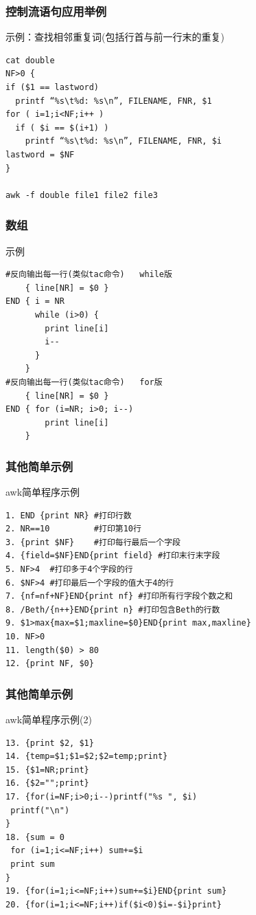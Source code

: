 \documentclass[xcolor=svgnames,presentation]{beamer}
\begin{document}
\begin{frame}[fragile]
\frametitle{控制流语句应用举例}
\label{sec-2-2-21}
\begin{exampleblock}{示例：查找相邻重复词(包括行首与前一行末的重复)}
\label{sec-2-2-21-1}


\begin{verbatim}
cat double
NF>0 {
if ($1 == lastword)
  printf “%s\t%d: %s\n”, FILENAME, FNR, $1
for ( i=1;i<NF;i++ )
  if ( $i == $(i+1) )
    printf “%s\t%d: %s\n”, FILENAME, FNR, $i
lastword = $NF
}

awk -f double file1 file2 file3
\end{verbatim}
\end{exampleblock}
\end{frame}
\begin{frame}[fragile]
\frametitle{数组}
\label{sec-2-2-22}
\begin{exampleblock}{示例}
\label{sec-2-2-22-1}


\begin{verbatim}
#反向输出每一行(类似tac命令)   while版
    { line[NR] = $0 }
END { i = NR
      while (i>0) {
        print line[i]
        i--
      } 
    }
#反向输出每一行(类似tac命令)   for版
    { line[NR] = $0 }
END { for (i=NR; i>0; i--)
        print line[i]
    }
\end{verbatim}
\end{exampleblock}
\end{frame}
\begin{frame}[fragile]
\frametitle{其他简单示例}
\label{sec-2-2-23}
\begin{exampleblock}{awk简单程序示例}
\label{sec-2-2-23-1}


\begin{verbatim}
1. END {print NR} #打印行数
2. NR==10         #打印第10行
3. {print $NF}    #打印每行最后一个字段
4. {field=$NF}END{print field} #打印末行末字段
5. NF>4  #打印多于4个字段的行
6. $NF>4 #打印最后一个字段的值大于4的行
7. {nf=nf+NF}END{print nf} #打印所有行字段个数之和
8. /Beth/{n++}END{print n} #打印包含Beth的行数
9. $1>max{max=$1;maxline=$0}END{print max,maxline}
10. NF>0
11. length($0) > 80
12. {print NF, $0}
\end{verbatim}
\end{exampleblock}
\end{frame}
\begin{frame}[fragile]
\frametitle{其他简单示例}
\label{sec-2-2-24}
\begin{exampleblock}{awk简单程序示例(2)}
\label{sec-2-2-24-1}


\begin{verbatim}
13. {print $2, $1}
14. {temp=$1;$1=$2;$2=temp;print}
15. {$1=NR;print}
16. {$2="";print}
17. {for(i=NF;i>0;i--)printf("%s ", $i)
 printf("\n")
}
18. {sum = 0
 for (i=1;i<=NF;i++) sum+=$i
 print sum
}
19. {for(i=1;i<=NF;i++)sum+=$i}END{print sum}
20. {for(i=1;i<=NF;i++)if($i<0)$i=-$i}print}
\end{verbatim}
\end{exampleblock}
\end{frame}
\end{document}
